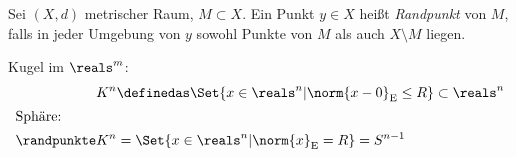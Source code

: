 \begin{definition}
    Sei \( (X,d) \) metrischer Raum, \( M\subset X \). Ein Punkt \( y\in X \) heißt \emph{Randpunkt} von \( M \), falls in jeder Umgebung von \( y \) sowohl Punkte von \( M \) als auch \( X\setminus M \) liegen.
\end{definition}
\begin{beispiel*}
   Kugel im \( \reals^m \):
   \begin{align*}
       K^n&\definedas \Set{x\in \reals^n| \norm{x-0}_\text{E}\leq R}\subset \reals^n\\
       \intertext{Sphäre:}
       \randpunkte K^n &=\Set{x\in \reals^n|\norm{x}_\text{E}= R}=S^{n-1}
   \end{align*} 
\end{beispiel*}

